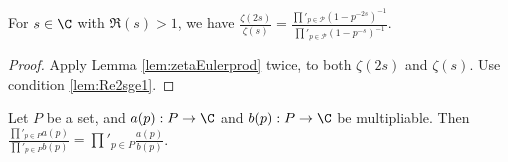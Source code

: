 \begin{lemma}\label{lem:zeta_ratio_prod} 
\leanok
{}
For $s\in\C$ with $\Re(s)>1$, we have $\frac{\zeta(2s)}{\zeta(s)} = \frac{\prod'_{p\in\mathcal{P}}(1-p^{-2s})^{-1}}{\prod'_{p\in\mathcal{P}}(1-p^{-s})^{-1}}$.
\end{lemma}
\begin{proof}
\leanok
{}
Apply Lemma \ref{lem:zetaEulerprod} twice, to both $\zeta(2s)$ and $\zeta(s)$. Use condition \cref{lem:Re2sge1}.
\end{proof}

\begin{lemma}\label{lem:prod_of_ratios} 
\leanok
Let $P$ be a set, and $a(p):P\to\C$ and $b(p):P\to\C$ be multipliable. Then $ \frac{\prod'_{p\in P} a(p)}{\prod'_{p\in P} b(p)} = \prod'_{p\in P} \frac{a(p)}{b(p)}$.
\end{lemma}
